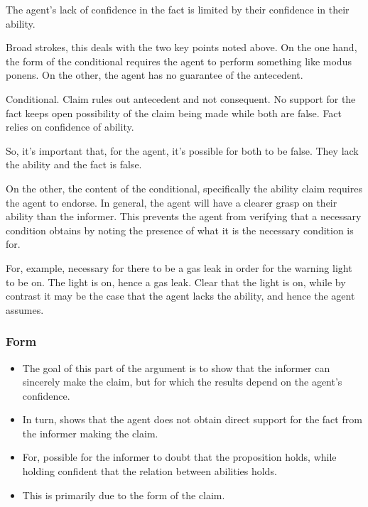 \documentclass[10pt]{article}
\begin{document}
The agent's lack of confidence in the fact is limited by their confidence in their ability.





Broad strokes, this deals with the two key points noted above.
On the one hand, the form of the conditional requires the agent to perform something like modus ponens.
On the other, the agent has no guarantee of the antecedent.

Conditional.
Claim rules out antecedent and not consequent.
No support for the fact keeps open possibility of the claim being made while both are false.
Fact relies on confidence of ability.

So, it's important that, for the agent, it's possible for both to be false.
They lack the ability and the fact is false.

On the other, the content of the conditional, specifically the ability claim requires the agent to endorse.
In general, the agent will have a clearer grasp on their ability than the informer.
This prevents the agent from verifying that a necessary condition obtains by noting the presence of what it is the necessary condition is for.

For, example, necessary for there to be a gas leak in order for the warning light to be on.
The light is on, hence a gas leak.
Clear that the light is on, while by contrast it may be the case that the agent lacks the ability, and hence the agent assumes.



\subsubsection{Form}
\label{sec:form}

\begin{itemize}
\item The goal of this part of the argument is to show that the informer can sincerely make the claim, but for which the results depend on the agent's confidence.
\item In turn, shows that the agent does not obtain direct support for the fact from the informer making the claim.
\item For, possible for the informer to doubt that the proposition holds, while holding confident that the relation between abilities holds.
\item This is primarily due to the form of the claim.
\end{itemize}
\end{document}
